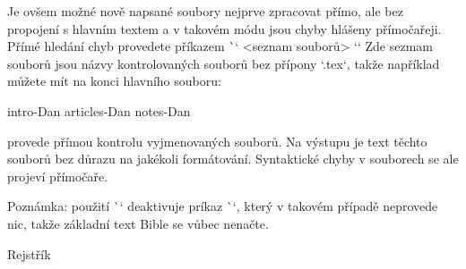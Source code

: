 Je ovšem možné nově napsané soubory nejprve zpracovat přímo, ale bez
propojení s hlavním textem a v takovém módu jsou chyby hlášeny přímočařeji.
Přímé hledání chyb provedete příkazem \`\checksyntax` <seznam souborů> `{}`
Zde sezmam souborů jsou názvy kontrolovaných souborů bez přípony `.tex`,
takže například můžete mít na konci hlavního souboru:

\begtt
\checksyntax intro-Dan articles-Dan notes-Dan {}
\endtt

provede přímou kontrolu vyjmenovaných souborů. Na výstupu je text těchto
souborů bez důrazu na jakékoli formátování. Syntaktické chyby v souborech se
ale projeví přímočaře.

Poznámka: použití \`\checksyntax` deaktivuje príkaz \`\processbooks`, který v
takovém případě neprovede nic, takže základní text Bible se vůbec nenačte.

\sec Rejstřík

\def\_sortinglang{en}
\typosize[9/]
\makeindex
\endmulti

\bye
